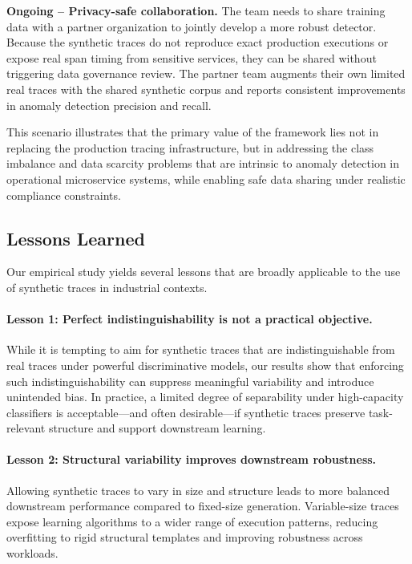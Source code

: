 \documentclass[sigconf,review]{acmart}
\begin{document}
{\textbf{Ongoing -- Privacy-safe collaboration.} The team needs to share training data with a partner organization to jointly develop a more robust detector. Because the synthetic traces do not reproduce exact production executions or expose real span timing from sensitive services, they can be shared without triggering data governance review. The partner team augments their own limited real traces with the shared synthetic corpus and reports consistent improvements in anomaly detection precision and recall.

This scenario illustrates that the primary value of the framework lies not in replacing the production tracing infrastructure, but in addressing the class imbalance and data scarcity problems that are intrinsic to anomaly detection in operational microservice systems, while enabling safe data sharing under realistic compliance constraints.}

\subsection{Lessons Learned}

Our empirical study yields several lessons that are broadly applicable to the use of synthetic traces in industrial contexts.

\paragraph{Lesson 1: Perfect indistinguishability is not a practical objective.}
While it is tempting to aim for synthetic traces that are indistinguishable from real traces under powerful discriminative models, our results show that enforcing such indistinguishability can suppress meaningful variability and introduce unintended bias. In practice, a limited degree of separability under high-capacity classifiers is acceptable---and often desirable---if synthetic traces preserve task-relevant structure and support downstream learning.

\paragraph{Lesson 2: Structural variability improves downstream robustness.}
Allowing synthetic traces to vary in size and structure leads to more balanced downstream performance compared to fixed-size generation. Variable-size traces expose learning algorithms to a wider range of execution patterns, reducing overfitting to rigid structural templates and improving robustness across workloads.
\end{document}
